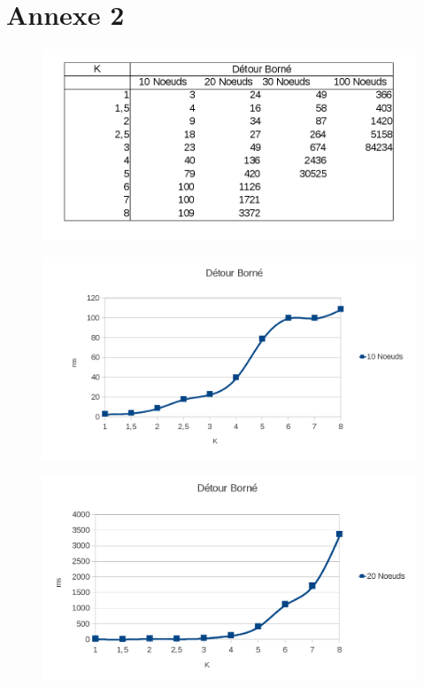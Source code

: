 \section{Annexe 2}
\begin{figure}[!h] 
\begin{center}
  \includegraphics[scale=0.40]{a21.png}
  \end{center}
\end{figure} 
  \begin{figure}[!h] 
\begin{center}
  \includegraphics[scale=0.40]{a22.png}
  \end{center}
\end{figure} 
  \begin{figure}[!h] 
\begin{center}
  \includegraphics[scale=0.40]{a23.png}
  \end{center}
\end{figure} 
